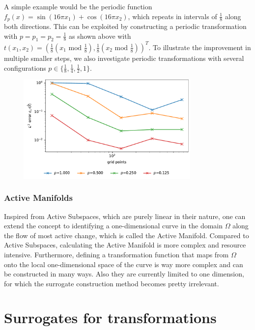 \documentclass[
  a4paper,  %
  twoside,  %
  bibliography=totoc,
  headsepline,
  cleardoublepage=empty,
  parskip=half,
  draft=false
]{scrbook}
\begin{document}
A simple example would be the periodic function $f_p(x)=\sin(16\pi x_1)  + \cos(16\pi x_2)$, which repeats in intervals of $\frac{1}{8}$ along both directions.
This can be exploited by constructing a periodic transformation with $p=p_1=p_2=\frac{1}{8}$ as shown above with $t(x_1,x_2)=(\frac{1}{8} (x_1 \text{ mod } \frac{1}{8}), \frac{1}{8} (x_2 \text{ mod } \frac{1}{8}))^T$.
To illustrate the improvement in multiple smaller steps, we also investigate periodic transformations with several configurations $p \in \{\frac{1}{8}, \frac{1}{4}, \frac{1}{2}, 1\}$.

\begin{figure}[H]
\centering
\includegraphics[width=0.8\textwidth]{graphics/periodic}
\label{fig:periodic}
\end{figure}

\subsection{Active Manifolds}

Inspired from Active Subspaces, which are purely linear in their nature, one can extend the concept to identifying a one-dimensional curve in the domain $\Omega$ along the flow of most active change, which is called the Active Manifold.
Compared to Active Subspaces, calculating the Active Manifold is more complex and resource intensive.
Furthermore, defining a transformation function that maps from $\Omega$ onto the local one-dimensional space of the curve is way more complex and can be constructed in many ways.
Also they are currently limited to one dimension, for which the surrogate construction method becomes pretty irrelevant.


\chapter{Surrogates for transformations}
\end{document}
